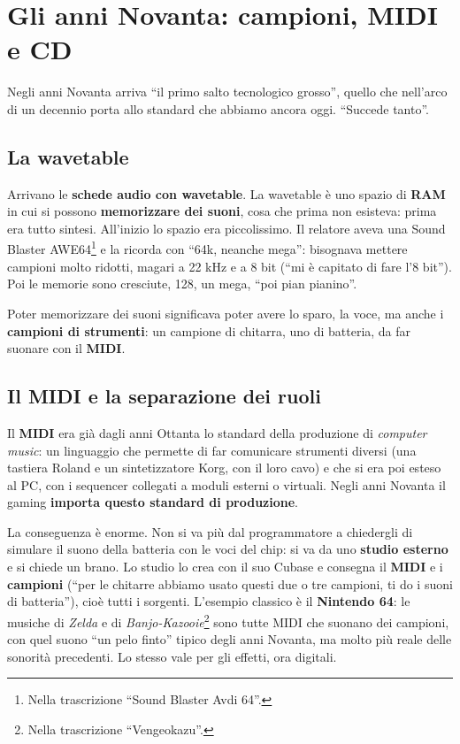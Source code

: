 \section{Gli anni Novanta: campioni, MIDI e CD}
\label{z9:sec:anni90}

Negli anni Novanta arriva ``il primo salto tecnologico grosso'', quello che
nell'arco di un decennio porta allo standard che abbiamo ancora oggi. ``Succede
tanto''.

\subsection{La wavetable}

Arrivano le \textbf{schede audio con wavetable}. La wavetable è uno spazio di
\textbf{RAM} in cui si possono \textbf{memorizzare dei suoni}, cosa che prima non
esisteva: prima era tutto sintesi. All'inizio lo spazio era piccolissimo. Il
relatore aveva una Sound Blaster AWE64\footnote{Nella trascrizione ``Sound
Blaster Avdi 64''.} e la ricorda con ``64k, neanche mega'': bisognava mettere
campioni molto ridotti, magari a 22 kHz e a 8 bit (``mi è capitato di fare
l'8 bit''). Poi le memorie sono cresciute, 128, un mega, ``poi pian pianino''.

Poter memorizzare dei suoni significava poter avere lo sparo, la voce, ma anche i
\textbf{campioni di strumenti}: un campione di chitarra, uno di batteria, da far
suonare con il \textbf{MIDI}.

\subsection{Il MIDI e la separazione dei ruoli}

Il \textbf{MIDI} era già dagli anni Ottanta lo standard della produzione di
\emph{computer music}: un linguaggio che permette di far comunicare strumenti
diversi (una tastiera Roland e un sintetizzatore Korg, con il loro cavo) e che si
era poi esteso al PC, con i sequencer collegati a moduli esterni o virtuali.
Negli anni Novanta il gaming \textbf{importa questo standard di produzione}.

La conseguenza è enorme. Non si va più dal programmatore a chiedergli di simulare
il suono della batteria con le voci del chip: si va da uno \textbf{studio
esterno} e si chiede un brano. Lo studio lo crea con il suo Cubase e consegna il
\textbf{MIDI} e i \textbf{campioni} (``per le chitarre abbiamo usato questi due o
tre campioni, ti do i suoni di batteria''), cioè tutti i sorgenti. L'esempio
classico è il \textbf{Nintendo 64}: le musiche di \emph{Zelda} e di
\emph{Banjo-Kazooie}\footnote{Nella trascrizione ``Vengeokazu''.} sono tutte MIDI
che suonano dei campioni, con quel suono ``un pelo finto'' tipico degli anni
Novanta, ma molto più reale delle sonorità precedenti. Lo stesso vale per gli
effetti, ora digitali.


